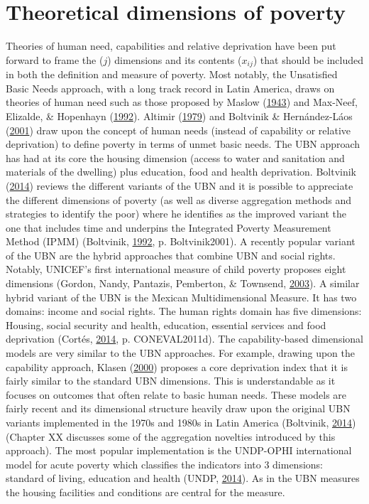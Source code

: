 \documentclass[]{book}
\begin{document}
\hypertarget{Chapter-1-dimensions}{%
\section{Theoretical dimensions of poverty}\label{Chapter-1-dimensions}}

Theories of human need, capabilities and relative deprivation have been put forward to frame the (\(j\)) dimensions and its contents (\(x_{ij}\)) that should be included in both the definition and measure of poverty. Most notably, the Unsatisfied Basic Needs approach, with a long track record in Latin America, draws on theories of human need such as those proposed by Maslow (\protect\hyperlink{ref-Maslow1943}{1943}) and Max-Neef, Elizalde, \& Hopenhayn (\protect\hyperlink{ref-Max-Neef1992}{1992}). Altimir (\protect\hyperlink{ref-Altimir1979}{1979}) and Boltvinik \& Hernández-Láos (\protect\hyperlink{ref-Boltvinik2001}{2001}) draw upon the concept of human needs (instead of capability or relative deprivation) to define poverty in terms of unmet basic needs. The UBN approach has had at its core the housing dimension (access to water and sanitation and materials of the dwelling) plus education, food and health deprivation. Boltvinik (\protect\hyperlink{ref-Boltvinik2014}{2014}) reviews the different variants of the UBN and it is possible to appreciate the different dimensions of poverty (as well as diverse aggregation methods and strategies to identify the poor) where he identifies as the improved variant the one that includes time and underpins the Integrated Poverty Measurement Method (IPMM) (Boltvinik, \protect\hyperlink{ref-Boltvinik1992}{1992}, p. Boltvinik2001). A recently popular variant of the UBN are the hybrid approaches that combine UBN and social rights. Notably, UNICEF's first international measure of child poverty proposes eight dimensions (Gordon, Nandy, Pantazis, Pemberton, \& Townsend, \protect\hyperlink{ref-Gordon2003}{2003}). A similar hybrid variant of the UBN is the Mexican Multidimensional Measure. It has two domains: income and social rights. The human rights domain has five dimensions: Housing, social security and health, education, essential services and food deprivation (Cortés, \protect\hyperlink{ref-Cortes2014}{2014}, p. CONEVAL2011d). The capability-based dimensional models are very similar to the UBN approaches. For example, drawing upon the capability approach, Klasen (\protect\hyperlink{ref-Klasen2000}{2000}) proposes a core deprivation index that it is fairly similar to the standard UBN dimensions. This is understandable as it focuses on outcomes that often relate to basic human needs. These models are fairly recent and its dimensional structure heavily draw upon the original UBN variants implemented in the 1970s and 1980s in Latin America (Boltvinik, \protect\hyperlink{ref-Boltvinik2014}{2014}) (Chapter XX discusses some of the aggregation novelties introduced by this approach). The most popular implementation is the UNDP-OPHI international model for acute poverty which classifies the indicators into 3 dimensions: standard of living, education and health (UNDP, \protect\hyperlink{ref-UNDP2014}{2014}). As in the UBN measures the housing facilities and conditions are central for the measure. 
\end{document}
